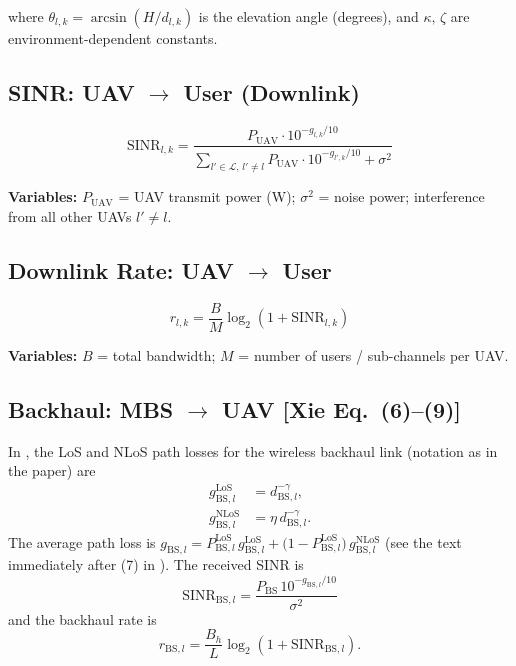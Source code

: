\documentclass[11pt,a4paper]{article}
\begin{document}
\noindent where $\theta_{l,k} = \arcsin(H / d_{l,k})$ is the elevation angle (degrees),
and $\kappa,\,\zeta$ are environment-dependent constants.

\subsection{SINR: UAV $\to$ User (Downlink)}

\begin{equation}
  \mathrm{SINR}_{l,k} =
    \frac{P_{\mathrm{UAV}} \cdot 10^{-g_{l,k}/10}}
         {\displaystyle\sum_{l' \in \mathcal{L},\, l' \neq l}
          P_{\mathrm{UAV}} \cdot 10^{-g_{l',k}/10} + \sigma^2}
  \tag{Xie~4}
\end{equation}

\noindent \textbf{Variables:}
$P_{\mathrm{UAV}}$ = UAV transmit power (W);
$\sigma^2$ = noise power;
interference from all other UAVs $l' \neq l$.

\subsection{Downlink Rate: UAV $\to$ User}

\begin{equation}
  r_{l,k} = \frac{B}{M} \log_2\!\left(1 + \mathrm{SINR}_{l,k}\right)
  \tag{Xie~5}
\end{equation}

\noindent \textbf{Variables:}
$B$ = total bandwidth;
$M$ = number of users / sub-channels per UAV.

\subsection{Backhaul: MBS $\to$ UAV [Xie Eq.~(6)--(9)]}

\noindent In \cite{Xie}, the LoS and NLoS path losses for the wireless backhaul link (notation as in the paper) are
\begin{align}
  g_{\mathrm{BS},l}^{\mathrm{LoS}}  &= d_{\mathrm{BS},l}^{-\gamma},
  \tag{Xie~6} \\
  g_{\mathrm{BS},l}^{\mathrm{NLoS}} &= \eta\, d_{\mathrm{BS},l}^{-\gamma}.
  \tag{Xie~7}
\end{align}
The average path loss is
$g_{\mathrm{BS},l} = P_{\mathrm{BS},l}^{\mathrm{LoS}}\, g_{\mathrm{BS},l}^{\mathrm{LoS}}
 + \bigl(1 - P_{\mathrm{BS},l}^{\mathrm{LoS}}\bigr)\, g_{\mathrm{BS},l}^{\mathrm{NLoS}}$
(see the text immediately after (7) in \cite{Xie}). The received SINR is
\begin{equation}
  \mathrm{SINR}_{\mathrm{BS},l} =
    \frac{P_{\mathrm{BS}}\, 10^{-g_{\mathrm{BS},l}/10}}{\sigma^2}
  \tag{Xie~8}
\end{equation}
and the backhaul rate is
\begin{equation}
  r_{\mathrm{BS},l} = \frac{B_h}{L} \log_2\!\left(1 + \mathrm{SINR}_{\mathrm{BS},l}\right).
  \tag{Xie~9}
\end{equation}
\end{document}
